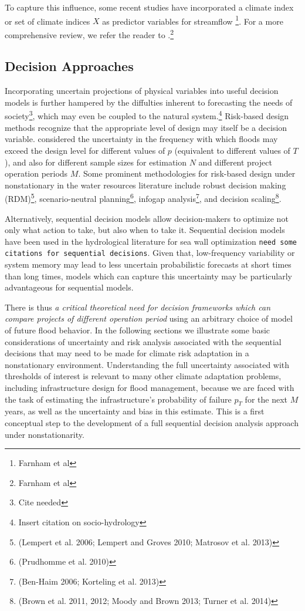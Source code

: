 \documentclass[12pt]{article}
\begin{document}
To capture this influence, some recent studies have incorporated a climate index or set of climate indices \(X\) as predictor variables for streamflow \citep{Delgado2014,Silva2016,Sun2014,Griffis2007}\footnote{Farnham et al}.
For a more comprehensive review, we refer the reader to \citet{Hall2014}.\footnote{Farnham et al}


\subsection{Decision Approaches}

Incorporating uncertain projections of physical variables into useful decision models is further hampered by the diffulties inherent to forecasting the needs of society\footnote{Cite needed}, which may even be coupled to the natural system.\footnote{Insert citation on socio-hydrology}
Risk-based design methods \citep[RBDM; see][]{Rosner2014} recognize that the appropriate level of design  may itself be a decision variable.
\citet{Lall1987} considered the uncertainty in the frequency with which floods may exceed the design level for different values of \(p\) (equivalent to different values of \(T\)), and also for different sample sizes for estimation \(N\) and different project operation periods \(M\).
Some prominent methodologies for risk-based design under nonstationary in the water resources literature include robust decision making (RDM)\footnote{(Lempert et al. 2006; Lempert and Groves 2010; Matrosov et al. 2013)}, scenario-neutral planning\footnote{(Prudhomme et al. 2010)}, infogap analysis\footnote{(Ben-Haim 2006; Korteling et al. 2013)}, and decision scaling\footnote{(Brown et al. 2011, 2012; Moody and Brown 2013; Turner et al. 2014)}. 

Alternatively, sequential decision models \citep[see][]{Russell2003,Howard1960} allow decision-makers to optimize not only what action to take, but also when to take it.
Sequential decision models have been used in the hydrological literature for sea wall optimization \citep{Lickley2014}
\texttt{need some citations for sequential decisions}.
Given that, low-frequency variability or system memory may lead to less uncertain probabilistic forecasts at short times than long times, models which can capture this uncertainty may be particularly advantageous for sequential models.

There is thus \emph{a critical theoretical need for decision frameworks which can compare projects of different operation period} using an arbitrary choice of model of future flood behavior.
In the following sections we illustrate some basic considerations of uncertainty and risk analysis associated with the sequential decisions that may need to be made for climate risk adaptation in a nonstationary environment.
Understanding the full uncertainty associated with thresholds of interest is relevant to many other climate adaptation problems, including infrastructure design for flood management, because we are faced with the task of estimating the infrastructure's probability of failure \(p_T\) for the next \(M\) years, as well as the uncertainty and bias in this estimate.
This is a first conceptual step to the development of a full sequential decision analysis approach under nonstationarity.
\end{document}
